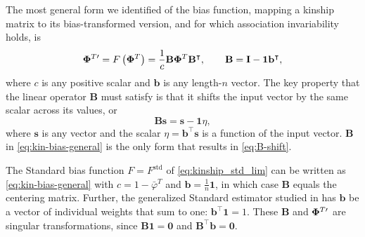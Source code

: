 \documentclass[11pt]{article}
\newcommand{\kinMat}[1][T]{%
  \ensuremath{%
    \mathbf{\Phi}^{#1}
  }%
  \xspace%
}%
\newcommand{\kinMatPrime}{%
  \ensuremath{%
    \mathbf{\Phi}^{T\prime}
  }%
  \xspace%
}%
\begin{document}
The most general form we identified of the bias function, mapping a kinship matrix to its bias-transformed version, and for which association invariability holds, is
\begin{equation}
  \label{eq:kin-bias-general}
  \kinMatPrime
  =
  F \left( \kinMat \right)
  =
  \frac{1}{c}
  \mathbf{B} \kinMat \mathbf{B}^\intercal
  , \quad\quad
  \mathbf{B}
  =
  \mathbf{I} - \mathbf{1} \mathbf{b}^\intercal
  ,
\end{equation}
where $c$ is any positive scalar and $\mathbf{b}$ is any length-$n$ vector.
The key property that the linear operator $\mathbf{B}$ must satisfy is that it shifts the input vector by the same scalar across its values, or
\begin{equation}
  \label{eq:B-shift}
  \mathbf{B} \mathbf{s}
  =
  \mathbf{s} - \mathbf{1} \eta
  ,
\end{equation}
where $\mathbf{s}$ is any vector and the scalar $\eta = \mathbf{b}^\intercal \mathbf{s}$ is a function of the input vector.
$\mathbf{B}$ in \cref{eq:kin-bias-general} is the only form that results in \cref{eq:B-shift}.

The Standard bias function $F = F^\text{std}$ of \cref{eq:kinship_std_lim} can be written as \cref{eq:kin-bias-general} with
$c = 1 - \bar{\varphi}^T$ and
$\mathbf{b} = \frac{1}{n} \mathbf{1}$, in which case $\mathbf{B}$ equals the centering matrix.
Further, the generalized Standard estimator studied in \citet{ochoa_estimating_2021} has $\mathbf{b}$ be a vector of individual weights that sum to one: $\mathbf{b}^\intercal \mathbf{1} = 1$.
These $\mathbf{B}$ and $\kinMatPrime$ are singular transformations, since $\mathbf{B} \mathbf{1} = \mathbf{0}$ and $\mathbf{B}^\intercal \mathbf{b} = \mathbf{0}$.
\end{document}
